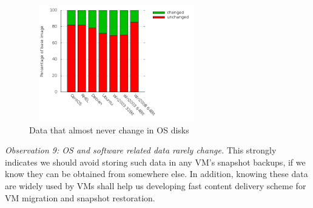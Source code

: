 \begin{figure}
  \centering
  \includegraphics[width=3in,height=2in]{os_subset.png}
  \caption{Data that almost never change in OS disks}
  \label{fig:osdup}
\end{figure}

\emph{Observation 9: OS and software related data rarely change.}
This strongly indicates we should avoid storing such data in any VM's snapshot backups,
if we know they can be obtained from somewhere else. 
In addition, knowing these data are widely used by VMs shall help us developing
fast content delivery scheme for VM migration and snapshot restoration.
